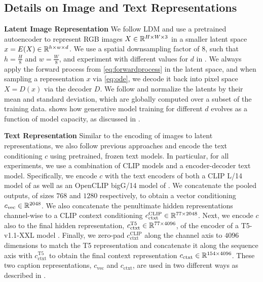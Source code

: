 \subsection{Details on Image and Text Representations}
\label{suppsec:detailsonreps}
\textbf{Latent Image Representation}
We follow LDM \cite{Rombach_2022} and use a pretrained autoencoder to represent RGB images $X
\in \mathbb{R}^{H\times W\times 3}$ in a smaller latent space $x=E(X) \in \mathbb{R}^{h\times
w \times d}$. We use a spatial downsampling factor of $8$, such that
$h=\frac{H}{8}$ and $w=\frac{W}{8}$, and experiment with different values for
$d$ in . We always apply the forward process
from \eqref{eq:forwardprocess} in the latent space, and when sampling a %
representation $x$ via \eqref{eq:ode}, we decode it back into pixel space $X =
D(x)$ via the decoder $D$.
We follow \citet{Rombach_2022} and normalize the latents by their mean and 
standard deviation, which are globally computed over a subset
of the training data. 
 shows how generative model training for different $d$ evolves as a function of model capacity, 
as discussed in .
\aefidstudy
%

\textbf{Text Representation}
Similar to the encoding of images to latent representations, we also follow
previous approaches \cite{saharia2022photorealistic, balaji2022ediffi} and encode the text conditioning $c$ using
pretrained, frozen text models. In particular, for all experiments, we use a
combination of CLIP \cite{radford2021learning} models and a encoder-decoder text model.
Specifically, we encode $c$ with the text encoders of both a CLIP L/14 model of
\citet{radford2021learning} as well as an OpenCLIP bigG/14 model of \citet{Cherti_2023}. We
concatenate the pooled outputs, of sizes $768$ and $1280$ respectively, to
obtain a vector conditioning $c_\text{vec} \in \mathbb{R}^{2048}$. We also concatenate
the penultimate hidden representations channel-wise to a CLIP context conditioning
$c_\text{ctxt}^{\text{CLIP}} \in \mathbb{R}^{77\times2048}$. Next, we encode $c$ also
to the final hidden representation,
$c_\text{ctxt}^{\text{T5}}\in\mathbb{R}^{77\times4096}$, of the encoder of a T5-v1.1-XXL model
\cite{raffel2019exploring}. Finally, we zero-pad $c^\text{CLIP}_\text{ctxt}$ along the channel
axis to $4096$ dimensions to match the T5 representation and concatenate it
along the sequence axis with $c_\text{ctxt}^\text{T5}$ to obtain the final
context representation $c_\text{ctxt}\in\mathbb{R}^{154\times4096}$. These two caption
representations, $c_\text{vec}$ and $c_\text{ctxt}$, are used in two different
ways as described in .

